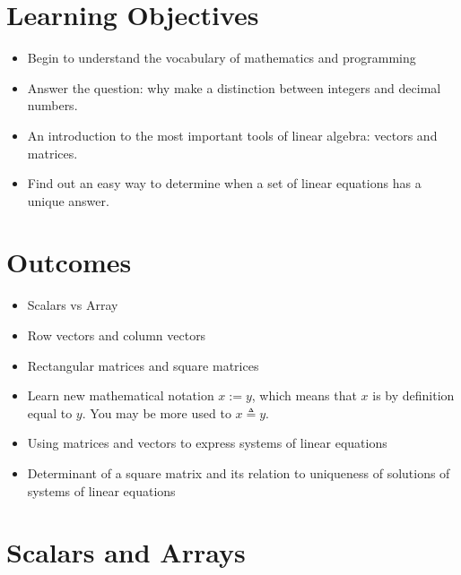 \section*{Learning Objectives}

\begin{itemize}
\item Begin to understand the vocabulary of mathematics and programming
\item Answer the question: why make a distinction between integers and decimal numbers.
\item An introduction to the most important tools of linear algebra: vectors and matrices.
\item Find out an easy way to determine when a set of linear equations has a unique answer.
\end{itemize}

\section*{Outcomes}
\begin{itemize}
    \item Scalars vs Array
    \item Row vectors and column vectors
    \item Rectangular matrices and square matrices
    \item Learn new mathematical notation $x:=y$, which means that $x$ is by definition equal to $y$. You may be more used to $x \triangleq y$. 
    \item Using matrices and vectors to express systems of linear equations
    \item Determinant of a square matrix and its relation to uniqueness of solutions of systems of linear equations
    \end{itemize}
    
\newpage

\section{Scalars and Arrays}

